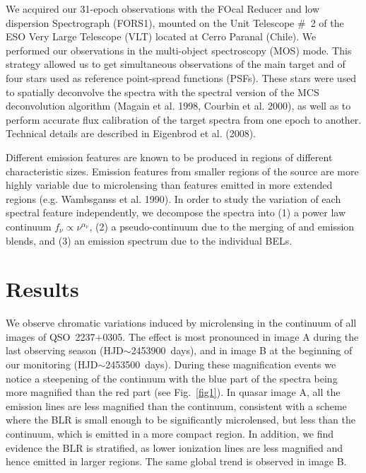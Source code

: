 \documentclass{PoS}
\def\obj{QSO~2237$+$0305}
\begin{document}
We acquired our 31-epoch  observations   with   the FOcal Reducer   and low
dispersion Spectrograph (FORS1), mounted on 
the Unit Telescope \#~2  of the ESO Very Large
Telescope (VLT) located at Cerro Paranal (Chile).  We performed our observations
in the  multi-object spectroscopy (MOS) mode.   This
strategy allowed us to get simultaneous observations of the main target
and   of  four  stars    used  as   reference point-spread   functions
(PSFs). These stars  were used to  spatially deconvolve the  spectra
with the spectral version  of the MCS deconvolution algorithm (Magain et al.
1998, Courbin et al.   2000), as
well  as to perform accurate flux  calibration of the target spectra
from one epoch to another. 
Technical details are described in Eigenbrod et al. (2008). 





















Different emission  features are known   to be produced  in regions of
different  characteristic  sizes. 
Emission features from smaller regions of the source are more highly variable due to 
microlensing than features emitted in more extended regions 
(e.g. Wambsganss et al. 1990).  
In order to study the variation
of each spectral  feature independently,   
we decompose the spectra into 
(1) a power law
continuum $f_{\nu}     \propto \nu^{\alpha_\nu}$, (2) a pseudo-continuum due to the merging of 
and  emission blends, and (3) an emission spectrum due to the
individual BELs.  



\section{Results}









We observe chromatic  variations induced by microlensing in the
continuum of  all images of  \obj.  The effect is most
pronounced  in image  A during  the last  observing season (HJD$\sim$2453900~days), and in
image  B at  the   beginning of our  monitoring (HJD$\sim$2453500~days).
During these magnification events we notice a steepening of the 
continuum with the blue part of the spectra being
more magnified than the red part (see Fig.~\ref{fig1}). 
In quasar image A,
all the emission lines are less magnified than the continuum, consistent with a
scheme where the BLR is small enough to be significantly microlensed, but less
than the continuum, which is emitted  in a more compact region.
In addition, we find evidence the BLR is stratified, as lower ionization lines 
are less magnified and hence emitted in larger regions.
The same global trend is observed in image B.
\end{document}
